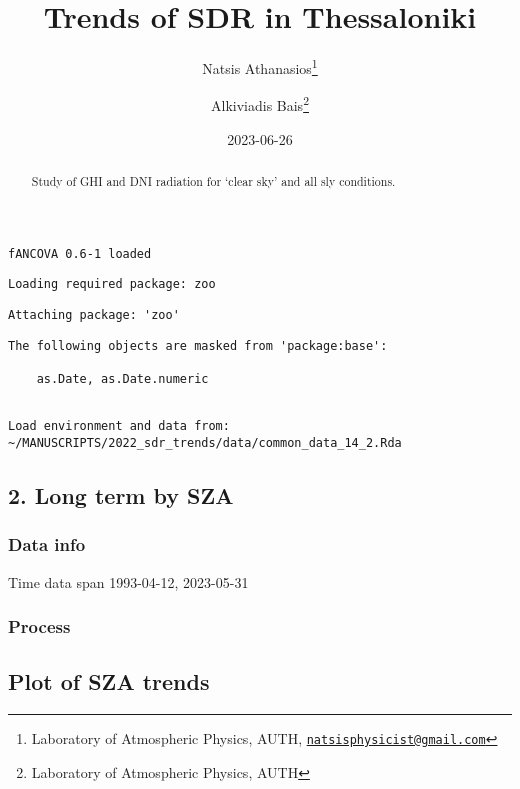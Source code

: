 \documentclass[
  10pt,
  a4paper,oneside]{article}
\title{Trends of SDR in Thessaloniki}
\author{Natsis Athanasios\footnote{Laboratory of Atmospheric Physics, AUTH, \href{mailto:natsisphysicist@gmail.com}{\nolinkurl{natsisphysicist@gmail.com}}} \and Alkiviadis Bais\footnote{Laboratory of Atmospheric Physics, AUTH}}
\date{2023-06-26}
\begin{document}
\maketitle
\begin{abstract}
Study of GHI and DNI radiation for `clear sky' and all sly conditions.
\end{abstract}

{
\hypersetup{linkcolor=}
\setcounter{tocdepth}{4}
\tableofcontents
}
\begin{verbatim}
fANCOVA 0.6-1 loaded
\end{verbatim}

\begin{verbatim}
Loading required package: zoo
\end{verbatim}

\begin{verbatim}
Attaching package: 'zoo'
\end{verbatim}

\begin{verbatim}
The following objects are masked from 'package:base':

    as.Date, as.Date.numeric
\end{verbatim}

\begin{verbatim}

Load environment and data from:  ~/MANUSCRIPTS/2022_sdr_trends/data/common_data_14_2.Rda 
\end{verbatim}

\hypertarget{long-term-by-sza}{%
\subsection{2. Long term by SZA}\label{long-term-by-sza}}

\hypertarget{data-info}{%
\subsubsection{Data info}\label{data-info}}

Time data span 1993-04-12, 2023-05-31

\hypertarget{process}{%
\subsubsection{Process}\label{process}}

\FloatBarrier

\hypertarget{plot-of-sza-trends}{%
\subsection{Plot of SZA trends}\label{plot-of-sza-trends}}
\end{document}
